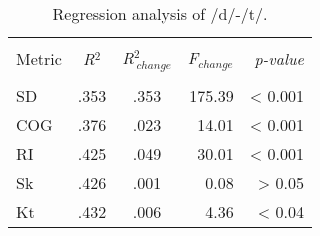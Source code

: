 \begin{table}[ht]
\centering
\caption{Regression analysis of /d/-/t/.\label{model_sum}}
\begin{tabular}{@{}lccrr@{}}

\hline \\ [-1ex]
Metric & \emph{R}$^2$ & \emph{R}$^2_{\ change}$ & \emph{F}$_{change}$ & \emph{p-value} \\ [1ex]
\hline \\ [-1ex]
SD  & .353  & .353 & 175.39 & < 0.001 \\
COG & .376  & .023 &  14.01 & < 0.001 \\
RI  & .425  & .049 &  30.01 & < 0.001 \\
Sk  & .426  & .001 &   0.08 & > 0.05  \\
Kt  & .432  & .006 &   4.36 & < 0.04  \\
\hline
\end{tabular}
\vspace{.05in}
\end{table}

